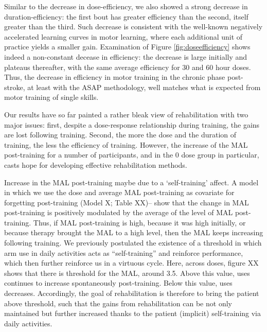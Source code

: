 Similar to the decrease in dose-efficiency, we also showed a strong decrease in duration-efficiency: the first bout has greater efficiency than the second, itself greater than the third. 
Such decrease is consistent with the well-known negatively accelerated learning curves in motor learning, where each additional unit of practice yields a smaller gain. 
Examination of Figure \ref{fig:doseefficiency} shows indeed a non-constant decease in efficiency: the decrease is large initially and plateaus thereafter, with the same average efficiency for 30 and 60 hour doses. 
Thus, the decrease in efficiency in motor training in the chronic phase post-stroke, at least with the ASAP methodology, well matches what is expected from motor training of single skills.

Our results have so far painted a rather bleak view of rehabilitation with two major issues: first, despite a dose-response relationship during training, the gains are lost following training. 
Second, the more the dose and the duration of training, the less the efficiency of training. 
However, the increase of the MAL post-training for a number of participants, and in the 0 dose group in particular, casts hope for developing effective rehabilitation methods. 

Increase in the MAL post-training maybe due to a ‘self-training’ affect. 
A model in which we use the dose and average MAL post-training  as covariate for forgetting post-training (Model X; Table XX)– show  that the change in MAL post-training is positively modulated by the average of the level of MAL post-training. 
Thus, if MAL post-training is high, because it was high initially, or because therapy brought the MAL to a high level, then the MAL keeps increasing following training. 
We previously postulated the existence of a threshold in which arm use in daily activities acts as “self-training” and reinforce performance, which then further reinforce us in a virtuous cycle. 
Here, across doses, figure XX shows that there is threshold for the MAL, around 3.5. 
Above this value, uses continues to increase spontaneously post-training. 
Below this value, uses decreases. 
Accordingly, the goal of rehabilitation is therefore to bring the patient above threshold, such that the gains from rehabilitation can be not only maintained but further increased thanks to the patient (implicit) self-training via daily activities. 

